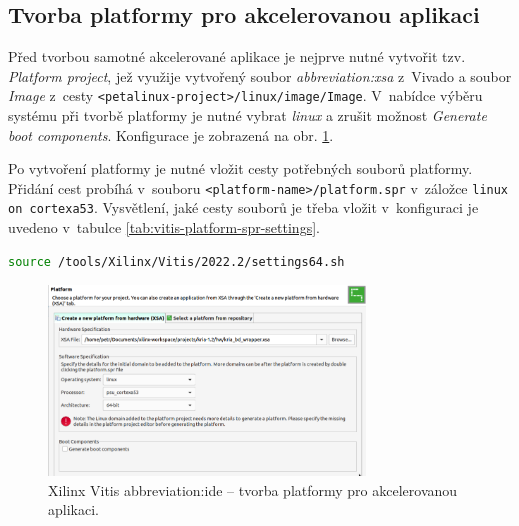 \documentclass[a4paper, twoside, 11pt]{article}
\begin{document}
		\subsection{Tvorba platformy pro akcelerovanou aplikaci}
		Před tvorbou samotné akcelerované aplikace je nejprve nutné vytvořit tzv. \textit{Platform project}, jež využije vytvořený soubor \textit{\gls{abbreviation:xsa}} z~Vivado a soubor \textit{Image} z~cesty \texttt{<petalinux-project>/linux/image/Image}. V~nabídce výběru systému při tvorbě platformy je nutné vybrat \textit{linux} a zrušit možnost \textit{Generate boot components}. Konfigurace je zobrazená na obr. \ref{fig:vitis-new-platform-linux}.\par
		Po vytvoření platformy je nutné vložit cesty potřebných souborů platformy. Přidání cest probíhá v~souboru \texttt{<platform-name>/platform.spr} v~záložce \texttt{linux on cortexa53}. Vysvětlení, jaké cesty souborů je třeba vložit v~konfiguraci je uvedeno v~tabulce \ref{tab:vitis-platform-spr-settings}.\par
	

	\begin{lstlisting}[language={sh}, caption={Aktivace prostředí pro Vitis verze 2022.2.}, label= {lst:vitis-environment}, morekeywords={source}]
source /tools/Xilinx/Vitis/2022.2/settings64.sh\end{lstlisting}


		\begin{figure}[htbp!]
			\centering
			\includegraphics[width=0.75\textwidth]{src/png/vitis-new-platform-linux.png}
			\caption{Xilinx Vitis \gls{abbreviation:ide} – tvorba platformy pro akcelerovanou aplikaci.}
			\label{fig:vitis-new-platform-linux}
		\end{figure}
\end{document}
